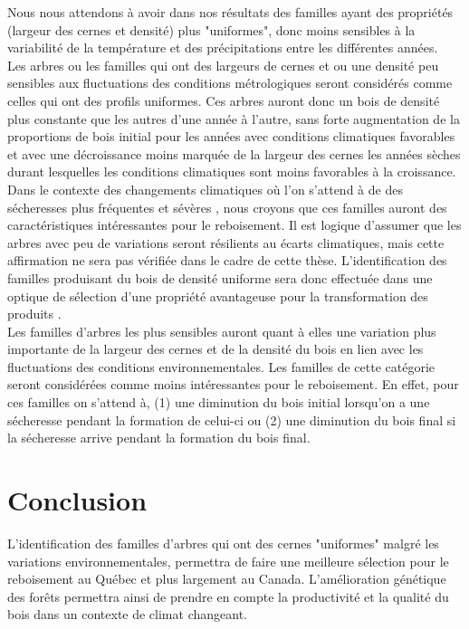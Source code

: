 \documentclass{report}
\begin{document}
Nous nous attendons à avoir dans nos résultats des familles ayant des propriétés (largeur des cernes et densité) plus "uniformes", donc moins sensibles à la variabilité de la température et des précipitations entre les différentes années.\\ 

Les arbres ou les familles qui ont des largeurs de cernes et ou une densité peu sensibles aux fluctuations des conditions métrologiques seront considérés comme celles qui ont des profils uniformes. Ces arbres auront donc un bois de densité plus constante que les autres d'une année à l'autre, sans forte augmentation de la proportions de bois initial pour les années avec conditions climatiques favorables et avec une décroissance moins marquée de la largeur des cernes les années sèches durant lesquelles les conditions climatiques sont moins favorables à la croissance. Dans le contexte des changements climatiques où l'on s'attend à de des sécheresses plus fréquentes et sévères \citep{IPCC_2015}, nous croyons que ces familles auront des caractéristiques intéressantes pour le reboisement. Il est logique d'assumer que les arbres avec peu de variations seront résilients au écarts climatiques, mais cette affirmation ne sera pas vérifiée dans le cadre de cette thèse. L'identification des familles produisant du bois de densité uniforme sera donc effectuée dans une optique de sélection d'une propriété avantageuse pour la transformation des produits \citep{Hernandez2001}. \\ 

Les familles d'arbres les plus sensibles auront quant à elles une variation plus importante de la largeur des cernes et de la densité du bois en lien avec les fluctuations des conditions environnementales. Les familles de cette catégorie seront considérées comme moins intéressantes pour le reboisement. En effet, pour ces familles on s'attend à, (1) une diminution du bois initial lorsqu'on a une sécheresse pendant la formation de celui-ci ou (2) une diminution du bois final si la sécheresse arrive pendant la formation du bois final.\\


\section{Conclusion}

L'identification des familles d'arbres qui ont des cernes "uniformes" malgré les variations environnementales, permettra de faire une meilleure sélection pour le reboisement au Québec et plus largement au Canada. L'amélioration génétique des forêts permettra ainsi de prendre en compte la productivité et la qualité du bois dans un contexte de climat changeant.\\
\end{document}
